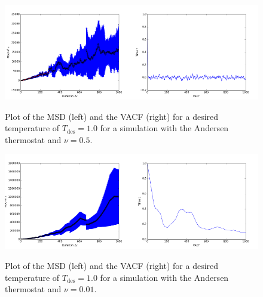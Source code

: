\begin{figure}[ht]
	\centering
	\includegraphics[width=0.5\textwidth]{../dat/andersen_T1d0_nu0d5_MSD.png}\includegraphics[width=0.5\textwidth]{../dat/andersen_T1d0_nu0d5_VACF.png}
	\caption{
		Plot of the MSD (left) and the VACF (right) for a desired temperature of $T_\text{des}=1.0$ for a simulation with the Andersen thermostat and $\nu =0.5$.
	}
	\label{andersennana5}
\end{figure}

\begin{figure}[ht]
	\centering
	\includegraphics[width=0.5\textwidth]{../dat/andersen_T1d0_nu0d01_MSD.png}\includegraphics[width=0.5\textwidth]{../dat/andersen_T1d0_nu0d01_VACF.png}
	\caption{
		Plot of the MSD (left) and the VACF (right) for a desired temperature of $T_\text{des}=1.0$ for a simulation with the Andersen thermostat and $\nu =0.01$.
	}
	\label{andersennana01}
\end{figure}

